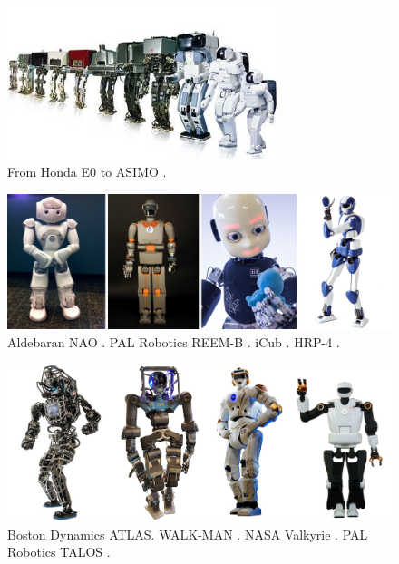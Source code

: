 \begin{figure}
    \centering
    \includegraphics[width=0.7\textwidth]{figures/01-introduction/The-ASIMO-humanoid-robot-history.png}
    \caption{From Honda E0 to ASIMO \cite{Shigemi2019ASIMOandHumanoidRobotResearchatHonda}.}
    \label{fig:introduction:ASIMO-humanoid-history}
\end{figure}

\begin{figure}
    \centering
    \includegraphics[width=\textwidth]{figures/01-introduction/robots-in-2000.jpg}
    \caption{Aldebaran NAO \cite{Gouaillier2008NAOHumanoid}.
        PAL Robotics REEM-B \cite{Tellez2008REEMB}.
        iCub \cite{Metta2010iCubHumanoid}.
        HRP-4 \cite{Kaneko2011HRP4}.
    }
    \label{fig:introduction:robots-in-2000}
\end{figure}

\begin{figure}
    \centering
    \includegraphics[width=\textwidth]{figures/01-introduction/robots-in-2010.jpg}
    \caption{Boston Dynamics ATLAS. WALK-MAN \cite{Tsagarakis2017WALKMAN}.
        NASA Valkyrie \cite{Radford2015Valkyrie}.
        PAL Robotics TALOS \cite{Stasse2017TALOS}.}
    \label{fig:introduction:robots-in-2010}
\end{figure}

